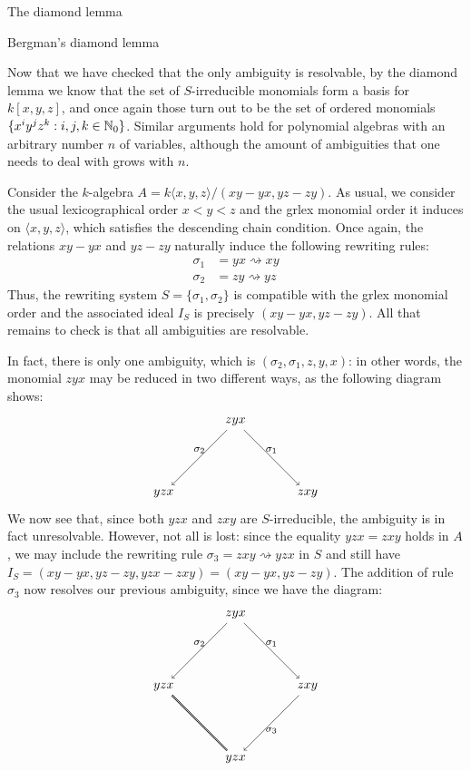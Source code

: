 \begin{chapter}{The diamond lemma}
\begin{section}{Bergman's diamond lemma}
\begin{exmp}
Now that we have checked that the only ambiguity is resolvable, by the diamond lemma we know that the set of $S$-irreducible monomials form a basis for $k[x,y,z]$, and once again those turn out to be the set of ordered monomials $\{x^iy^jz^k:i,j,k\in\mathbb{N}_0\}$. Similar arguments hold for polynomial algebras with an arbitrary number $n$ of variables, although the amount of ambiguities that one needs to deal with grows with $n$.
\end{exmp}
\begin{exmp} Consider the $k$-algebra $A=k\langle x,y,z\rangle/(xy-yx, yz-zy)$. As usual, we consider the usual lexicographical order $x<y<z$ and the grlex monomial order it induces on $\langle x,y,z\rangle$, which satisfies the descending chain condition. Once again, the relations $xy-yx$ and $yz-zy$ naturally induce the following rewriting rules:
\begin{align*}
\sigma_1 &= yx \rightsquigarrow xy\\
\sigma_2 &= zy \rightsquigarrow yz
\end{align*}
Thus, the rewriting system $S=\{\sigma_1, \sigma_2\}$ is compatible with the grlex monomial order and the associated ideal $I_S$ is precisely $(xy-yx, yz-zy)$. All that remains to check is that all ambiguities are resolvable.

In fact, there is only one ambiguity, which is $(\sigma_2,\sigma_1,z,y,x)$: in other words, the monomial $zyx$ may be reduced in two different ways, as the following diagram shows:
\[
\begin{tikzpicture}
\node (1) at (0,0) {$zyx$};
\node (a1) at (-2,-2) {$yzx$};
\node (a2) at (2,-2) {$zxy$};

\draw[->] (1) to node[above, font=\footnotesize]{$\sigma_2$} (a1);
\draw[->] (1) to node[above, font=\footnotesize]{$\sigma_1$} (a2);
\end{tikzpicture}
\]
We now see that, since both $yzx$ and $zxy$ are $S$-irreducible, the ambiguity is in fact unresolvable. However, not all is lost: since the equality $yzx = zxy$ holds in $A$, we may include the rewriting rule $\sigma_3 = zxy \rightsquigarrow yzx$ in $S$ and still have $I_S = (xy-yx, yz-zy, yzx-zxy) = (xy-yx, yz-zy)$. The addition of rule $\sigma_3$ now resolves our previous ambiguity, since we have the diagram:
\[
\begin{tikzpicture}
\node (1) at (0,0) {$zyx$};
\node (a1) at (-2,-2) {$yzx$};
\node (a2) at (2,-2) {$zxy$};
\node (b) at (0,-4) {$yzx$};

\draw[->] (1) to node[above, font=\footnotesize]{$\sigma_2$} (a1);
\draw[->] (1) to node[above, font=\footnotesize]{$\sigma_1$} (a2);
\draw[->] (a2) to node[below, font=\footnotesize]{$\sigma_3$} (b);
\draw[double] (a1) to (b);
\end{tikzpicture}
\]


\end{exmp}
\end{section}
\end{chapter}
